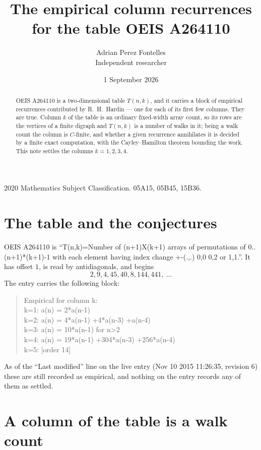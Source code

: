 \documentclass[11pt,a4paper]{article}
\title{The empirical column recurrences for the table OEIS A264110}
\author{Adrian Perez Fontelles\\ \small Independent researcher}
\date{1 September 2026}
\theoremstyle{plain}
\theoremstyle{definition}
\begin{document}
\maketitle

\begin{abstract}
OEIS A264110 is a two-dimensional table $T(n,k)$, and it carries a block of empirical
recurrences contributed by R.~H.~Hardin --- one for each of its first few columns. They are
true. Column $k$ of the table is an ordinary fixed-width array count, so its rows are the
vertices of a finite digraph and $T(n,k)$ is a number of walks in it; being a walk count the
column is $C$-finite, and whether a given recurrence annihilates it is decided by a finite
exact computation, with the Cayley--Hamilton theorem bounding the work. This note settles the columns $k=1, 2, 3, 4$.
\end{abstract}

\noindent\small 2020 Mathematics Subject Classification. 05A15, 05B45, 15B36.\normalsize

\section{The table and the conjectures}

OEIS A264110 is ``T(n,k)=Number of (n+1)X(k+1) arrays of permutations of 0..(n+1)*(k+1)-1 with each element having index change +-(.,.) 0,0 0,2 or 1,1.''. It has offset $1$, is
read by antidiagonals, and begins
\[
2, 9, 4, 45, 40, 8, 144, 441,\ \dots
\]
The entry carries the following block:
\begin{quote}\small
Empirical for column k:\\
k=1: a(n) = 2*a(n-1)\\
k=2: a(n) = 4*a(n-1) +4*a(n-3) +a(n-4)\\
k=3: a(n) = 10*a(n-1) for n>2\\
k=4: a(n) = 19*a(n-1) +304*a(n-3) +256*a(n-4)\\
k=5: [order 14]\\
\end{quote}
As of the ``Last modified'' line on the live entry (Nov 10 2015 11:26:35, revision 6) these are still
recorded as empirical, and nothing on the entry records any of them as settled.

\section{A column of the table is a walk count}
\end{document}
